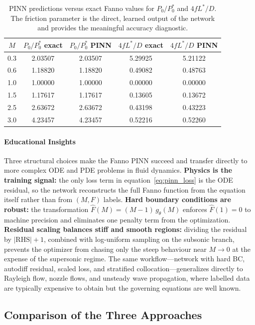\documentclass[11pt,a4paper]{report}
\begin{document}
\begin{table}[h!]
\centering
\small
\caption{PINN predictions versus exact Fanno values for $P_0/P_0^*$ and $4fL^*/D$. The friction parameter is the direct, learned output of the network and provides the meaningful accuracy diagnostic.}
\label{tab:mach_table_2}
\begin{tabular}{c|cc|cc}
\hline
$M$ & $P_0/P_0^*$ exact & $P_0/P_0^*$ PINN & $4fL^*/D$ exact & $4fL^*/D$ PINN \\
\hline
0.3 & 2.03507 & 2.03507 & 5.29925 & 5.21122 \\
0.6 & 1.18820 & 1.18820 & 0.49082 & 0.48763 \\
1.0 & 1.00000 & 1.00000 & 0.00000 & 0.00000 \\
1.5 & 1.17617 & 1.17617 & 0.13605 & 0.13672 \\
2.5 & 2.63672 & 2.63672 & 0.43198 & 0.43223 \\
3.0 & 4.23457 & 4.23457 & 0.52216 & 0.52260 \\
\hline
\end{tabular}
\end{table}

\paragraph{Educational Insights}
Three structural choices make the Fanno PINN succeed and transfer directly to more complex ODE and PDE problems in fluid dynamics. \textbf{Physics is the training signal:} the only loss term in equation~\eqref{eq:pinn_loss} is the ODE residual, so the network reconstructs the full Fanno function from the equation itself rather than from $(M,F)$ labels. \textbf{Hard boundary conditions are robust:} the transformation $\hat{F}(M) = (M-1)\,g_{\theta}(M)$ enforces $\hat{F}(1)=0$ to machine precision and eliminates one penalty term from the optimization. \textbf{Residual scaling balances stiff and smooth regions:} dividing the residual by $|\mathrm{RHS}|+1$, combined with log-uniform sampling on the subsonic branch, prevents the optimizer from chasing only the steep behaviour near $M\!\to\!0$ at the expense of the supersonic regime. The same workflow---network with hard BC, autodiff residual, scaled loss, and stratified collocation---generalizes directly to Rayleigh flow, nozzle flows, and unsteady wave propagation, where labelled data are typically expensive to obtain but the governing equations are well known.

\subsection{Comparison of the Three Approaches}
\label{sec:comparison}
\end{document}
